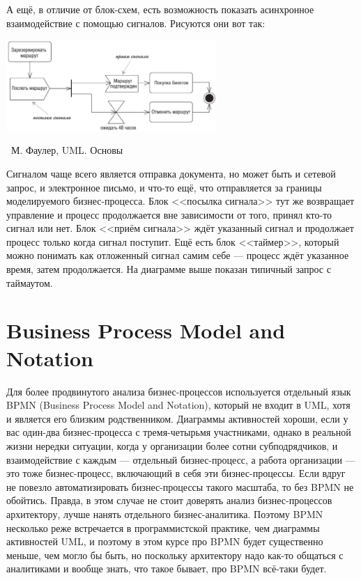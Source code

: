\documentclass[a5paper]{article}
\newcommand{\attribution}[1] {
    \vspace{-4mm}\begin{flushright}\begin{scriptsize}%
    {\textcopyright\, #1}\end{scriptsize}\end{flushright}
}
\begin{document}
А ещё, в отличие от блок-схем, есть возможность показать асинхронное взаимодействие с помощью сигналов. Рисуются они вот так:

\begin{center}
    \includegraphics[width=0.6\textwidth]{activitySignals.png}
    \attribution{М. Фаулер, UML. Основы}
\end{center}

Сигналом чаще всего является отправка документа, но может быть и сетевой запрос, и электронное письмо, и что-то ещё, что отправляется за границы моделируемого бизнес-процесса. Блок <<посылка сигнала>> тут же возвращает управление и процесс продолжается вне зависимости от того, принял кто-то сигнал или нет. Блок <<приём сигнала>> ждёт указанный сигнал и продолжает процесс только когда сигнал поступит. Ещё есть блок <<таймер>>, который можно понимать как отложенный сигнал самим себе --- процесс ждёт указанное время, затем продолжается. На диаграмме выше показан типичный запрос с таймаутом.

\section{Business Process Model and Notation}

Для более продвинутого анализа бизнес-процессов используется отдельный язык BPMN (Business Process Model and Notation), который не входит в UML, хотя и является его близким родственником. Диаграммы активностей хороши, если у вас один-два бизнес-процесса с тремя-четырьмя участниками, однако в реальной жизни нередки ситуации, когда у организации более сотни субподрядчиков, и взаимодействие с каждым --- отдельный бизнес-процесс, а работа организации --- это тоже бизнес-процесс, включающий в себя эти бизнес-процессы. Если вдруг не повезло автоматизировать бизнес-процессы такого масштаба, то без BPMN не обойтись. Правда, в этом случае не стоит доверять анализ бизнес-процессов архитектору, лучше нанять отдельного бизнес-аналитика. Поэтому BPMN несколько реже встречается в программистской практике, чем диаграммы активностей UML, и поэтому в этом курсе про BPMN будет существенно меньше, чем могло бы быть, но поскольку архитектору надо как-то общаться с аналитиками и вообще знать, что такое бывает, про BPMN всё-таки будет.
\end{document}
